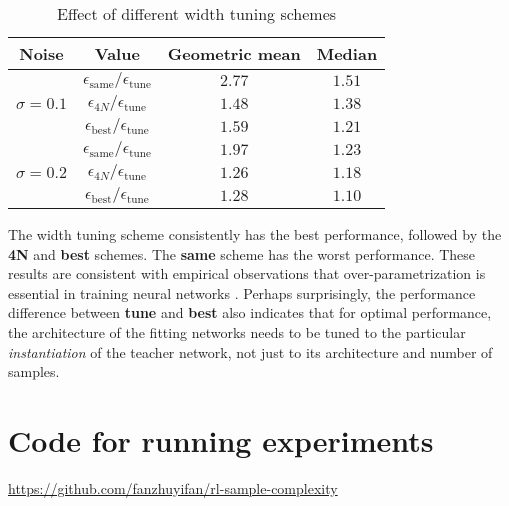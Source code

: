 \documentclass[twoside,11pt]{article}
\begin{document}
\begin{table}[htbp]
   \begin{center}
      \begin{tabular}{ c c c c }
         \hline
         Noise                         & Value                                       & Geometric mean & Median
         \\ \hline
         \multirow{3}{*}{$\sigma=0.1$} & $\epsilon_\text{same}/\epsilon_\text{tune}$ & $2.77$         & $1.51$
         \\
                                       & $\epsilon_{4N}/\epsilon_\text{tune}$        & $1.48$         & $1.38$
         \\
                                       & $\epsilon_\text{best}/\epsilon_\text{tune}$ & $1.59$         & $1.21$
         \\ \hline
         \multirow{3}{*}{$\sigma=0.2$} & $\epsilon_\text{same}/\epsilon_\text{tune}$ & $1.97$         & $1.23$
         \\
                                       & $\epsilon_{4N}/\epsilon_\text{tune}$        & $1.26$         & $1.18$
         \\
                                       & $\epsilon_\text{best}/\epsilon_\text{tune}$ & $1.28$         & $1.10$
      \end{tabular}
   \end{center}
   \caption{Effect of different width tuning schemes}
   \label{tab:fitting-different-width-stats}
\end{table}

The width tuning scheme consistently has the best performance, followed by the \textbf{4N} and \textbf{best} schemes.
The \textbf{same} scheme has the worst performance.
These results are consistent with empirical observations that over-parametrization is essential in training neural networks \citep{2017-Ge-learning-one-hidden-layer-neural-networks-with-landscape-design,2014-Livni-on-the-computational-efficiency,2018-Neyshabur-towards-understanding-the-role-of-over-parametrization}.
Perhaps surprisingly, the performance difference between \textbf{tune} and \textbf{best} also indicates that for optimal performance, the architecture of the fitting networks needs to be tuned to the particular \emph{instantiation} of the teacher network, not just to its architecture and number of samples.


\section{Code for running experiments}
\label{sec:appendix-code-url}
\url{https://github.com/fanzhuyifan/rl-sample-complexity}
\end{document}
